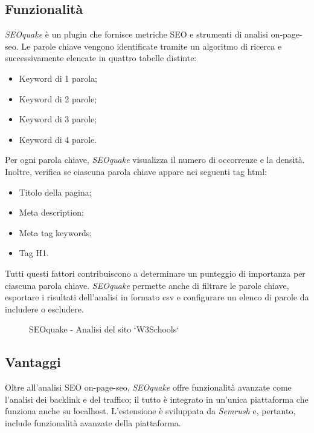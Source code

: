 \subsection{Funzionalità}
\par \textit{SEOquake} è un plugin che fornisce metriche SEO e strumenti di analisi \gls{on-page-seo}. Le parole chiave vengono identificate tramite un algoritmo di ricerca e successivamente elencate in quattro tabelle distinte:
\begin{itemize}
    \item Keyword di 1 parola;
    \item Keyword di 2 parole;
    \item Keyword di 3 parole;
    \item Keyword di 4 parole.
\end{itemize}
\par\noindent Per ogni parola chiave, \textit{SEOquake} visualizza il numero di occorrenze e la densità. Inoltre, verifica se ciascuna parola chiave appare nei seguenti tag \gls{html}:
\begin{itemize}
    \item Titolo della pagina;
    \item Meta description;
    \item Meta tag keywords;
    \item Tag H1.
\end{itemize}
\par\noindent Tutti questi fattori contribuiscono a determinare un punteggio di importanza per ciascuna parola chiave. \textit{SEOquake} permette anche di filtrare le parole chiave, esportare i risultati dell'analisi in formato \gls{csv} e configurare un elenco di parole da includere o escludere.

\begin{figure}[H]
    \centering 
    \caption{SEOquake - Analisi del sito `W3Schools`}
\end{figure}

\subsection{Vantaggi}
\par Oltre all'analisi SEO \gls{on-page-seo}, \textit{SEOquake} offre funzionalità avanzate come l'analisi dei \gls{backlink} e del traffico; il tutto è integrato in un'unica piattaforma che funziona anche su \gls{localhost}. L'estensione è sviluppata da \textit{Semrush} e, pertanto, include funzionalità avanzate della piattaforma.

